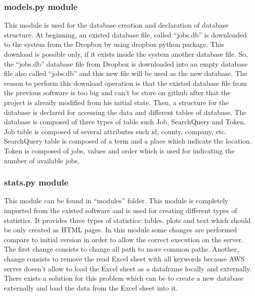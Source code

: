 \documentclass[conference,compsoc]{IEEEtran}
\begin{document}
\subsubsection{models.py module}
This module is used for the database creation and declaration of database structure. At beginning, an existed database file, called “jobs.db” is downloaded to the system from the Dropbox by using dropbox python package. This download is possible only, if it exists inside the system another database file. So, the “jobs.db” database file from Dropbox is downloaded into an empty database file also called “jobs.db” and this new file will be used as the new database. The reason to perform this download operation is that the existed database file from the previous software is too big and can’t be store on github after that the project is already modified from his initial state.           
\newline                                       
Then, a structure for the database is declared for accessing the data and different tables of database. The database is composed of three types of table such Job, SearchQuery and Token. Job table is composed of several attributes such id, county, company, etc. SearchQuery table is composed of a term and a place which indicate the location. Token is composed of jobs, values and order which is used for indicating the number of available jobs.                                 

\subsubsection{stats.py module} 
This module can be found in “modules” folder. This module is completely imported from the existed software and is used for creating different types of statistics. It provides three types of statistics: tables, plots and text which should be only created as HTML pages. In this module some changes are performed compare to initial version in order to allow the correct execution on the server. The first change consists to change all path to more common paths. Another, change consists to remove the read Excel sheet with all keywords because AWS server doesn’t allow to load the Excel sheet as a dataframe locally and externally. There exists a solution for this problem which can be to create a new database externally and load the data from the Excel sheet into it.  
\end{document}
